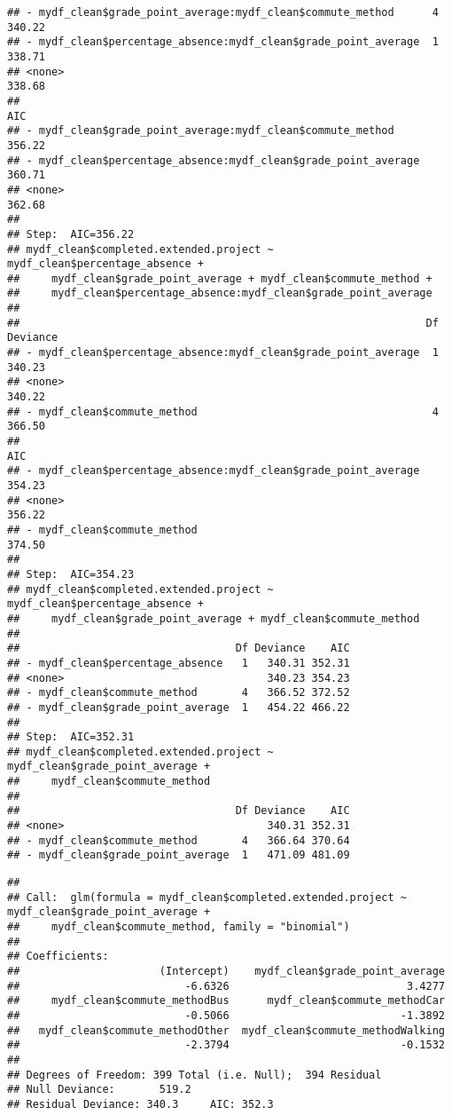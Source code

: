 \documentclass[
]{article}
\begin{document}
\begin{verbatim}
## - mydf_clean$grade_point_average:mydf_clean$commute_method      4   340.22
## - mydf_clean$percentage_absence:mydf_clean$grade_point_average  1   338.71
## <none>                                                              338.68
##                                                                   AIC
## - mydf_clean$grade_point_average:mydf_clean$commute_method     356.22
## - mydf_clean$percentage_absence:mydf_clean$grade_point_average 360.71
## <none>                                                         362.68
## 
## Step:  AIC=356.22
## mydf_clean$completed.extended.project ~ mydf_clean$percentage_absence + 
##     mydf_clean$grade_point_average + mydf_clean$commute_method + 
##     mydf_clean$percentage_absence:mydf_clean$grade_point_average
## 
##                                                                Df Deviance
## - mydf_clean$percentage_absence:mydf_clean$grade_point_average  1   340.23
## <none>                                                              340.22
## - mydf_clean$commute_method                                     4   366.50
##                                                                   AIC
## - mydf_clean$percentage_absence:mydf_clean$grade_point_average 354.23
## <none>                                                         356.22
## - mydf_clean$commute_method                                    374.50
## 
## Step:  AIC=354.23
## mydf_clean$completed.extended.project ~ mydf_clean$percentage_absence + 
##     mydf_clean$grade_point_average + mydf_clean$commute_method
## 
##                                  Df Deviance    AIC
## - mydf_clean$percentage_absence   1   340.31 352.31
## <none>                                340.23 354.23
## - mydf_clean$commute_method       4   366.52 372.52
## - mydf_clean$grade_point_average  1   454.22 466.22
## 
## Step:  AIC=352.31
## mydf_clean$completed.extended.project ~ mydf_clean$grade_point_average + 
##     mydf_clean$commute_method
## 
##                                  Df Deviance    AIC
## <none>                                340.31 352.31
## - mydf_clean$commute_method       4   366.64 370.64
## - mydf_clean$grade_point_average  1   471.09 481.09
\end{verbatim}

\begin{verbatim}
## 
## Call:  glm(formula = mydf_clean$completed.extended.project ~ mydf_clean$grade_point_average + 
##     mydf_clean$commute_method, family = "binomial")
## 
## Coefficients:
##                      (Intercept)    mydf_clean$grade_point_average  
##                          -6.6326                            3.4277  
##     mydf_clean$commute_methodBus      mydf_clean$commute_methodCar  
##                          -0.5066                           -1.3892  
##   mydf_clean$commute_methodOther  mydf_clean$commute_methodWalking  
##                          -2.3794                           -0.1532  
## 
## Degrees of Freedom: 399 Total (i.e. Null);  394 Residual
## Null Deviance:       519.2 
## Residual Deviance: 340.3     AIC: 352.3
\end{verbatim}
\end{document}
